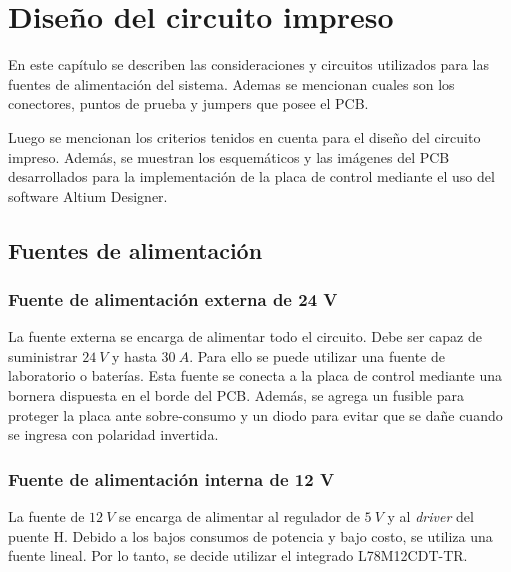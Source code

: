 \chapter{Diseño del circuito impreso}  \label{cap:PCB}



En este capítulo se describen las consideraciones y circuitos utilizados para las fuentes de alimentación del sistema. Ademas se mencionan cuales son los conectores, puntos de prueba y jumpers que posee el PCB.

Luego se mencionan los criterios tenidos en cuenta para el diseño del circuito impreso. Además, se muestran los esquemáticos y las imágenes del PCB desarrollados para la implementación de la placa de control mediante el uso del software Altium Designer.


\section{Fuentes de alimentación}

\subsection{Fuente de alimentación externa de 24 V}

La fuente externa se encarga de alimentar todo el circuito. Debe ser capaz de suministrar $24\:V$ y hasta $30\:A$. Para ello se puede utilizar una fuente de laboratorio o baterías. Esta fuente se conecta a la placa de control mediante una bornera dispuesta en el borde del PCB. Además, se agrega un fusible para proteger la placa ante sobre-consumo y un diodo para evitar que se dañe cuando se ingresa con polaridad invertida.

\subsection{Fuente de alimentación interna de 12 V}

La fuente de $12\:V$ se encarga de alimentar al regulador de $5\:V$ y al \textsl{driver} del puente H. Debido a los bajos consumos de potencia y bajo costo, se utiliza una fuente lineal. Por lo tanto, se decide utilizar el integrado L78M12CDT-TR.


